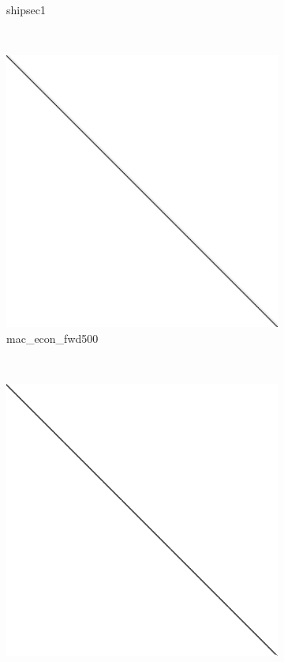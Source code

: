 \begin{figure}
\begin{multicols}{4}
\begin{subfigure}{\linewidth}
\caption{shipsec1}
\end{subfigure}~%
\begin{subfigure}{\linewidth}
\includegraphics[width=\linewidth]{images/mac_econ_fwd500}
\caption{mac\_econ\_fwd500}
\end{subfigure}~%
\begin{subfigure}{\linewidth}
\includegraphics[width=\linewidth]{images/cant}

\end{subfigure}
\end{multicols}
\end{figure}
